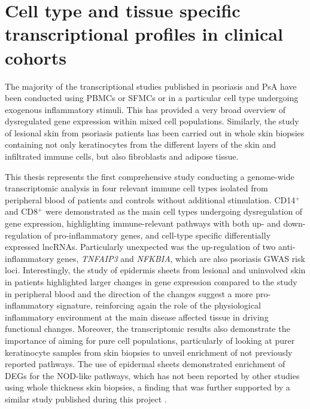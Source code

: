 




\section{Cell type and tissue specific transcriptional profiles in clinical cohorts}

The majority of the transcriptional studies published in psoriasis and PsA have been conducted using PBMCs or SFMCs or in a particular cell type undergoing exogenous inflammatory stimuli. This has provided a very broad overview of dysregulated gene expression within mixed cell populations. Similarly, the study of lesional skin from psoriasis patients has been carried out in whole skin biopsies containing not only keratinocytes from the different layers of the skin and infiltrated immune cells, but also fibroblasts and adipose tissue. 

This thesis represents the first comprehensive study conducting a genome-wide transcriptomic analysis in four relevant immune cell types isolated from peripheral blood of patients and controls without additional stimulation. CD14$^+$ and CD8$^+$ were demonstrated as the main cell types undergoing dysregulation of gene expression, highlighting immune-relevant pathways with both up- and down-regulation of pro-inflammatory genes, and cell-type specific differentially expressed lncRNAs. Particularly unexpected was the up-regulation of two anti-inflammatory genes, \textit{TNFAIP3} and \textit{NFKBIA}, which are also psoriasis GWAS risk loci. Interestingly, the study of epidermis sheets from lesional and uninvolved skin in patients highlighted larger changes in gene expression compared to the study in peripheral blood and the direction of the changes suggest a more pro-inflammatory signature, reinforcing again the role of the physiological inflammatory environment at the main disease affected tissue in driving functional changes. Moreover, the transcriptomic results also demonstrate the importance of aiming for pure cell populations, particularly of looking at purer keratinocyte samples from skin biopsies to unveil enrichment of not previously reported pathways. The use of epidermal sheets demonstrated enrichment of DEGs for the NOD-like pathways, which has not been reported by other studies using whole thickness skin biopsies, a finding that was further supported by a similar study published during this project \parencite{Tervaniemi2016}. 

